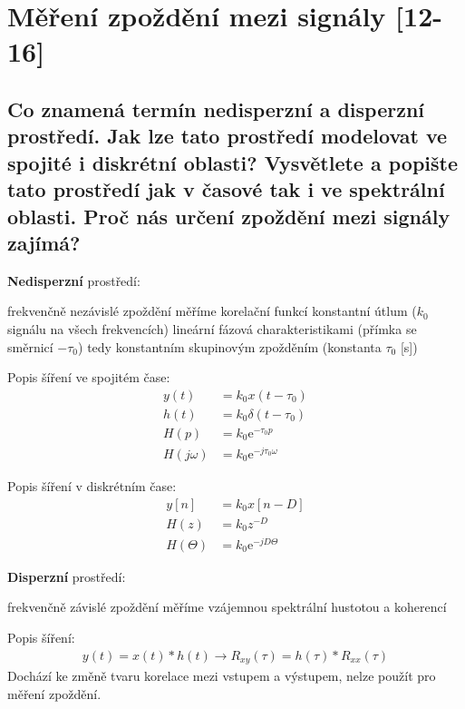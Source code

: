 \documentclass[a4paper,12pt]{article}   %
\newcommand{\mt}[1]{$#1$}
\newcommand{\e}{\text{e}}
\begin{document}
\clearpage


\section{Měření zpoždění mezi signály [12-16]} 
\subsection{Co znamená termín nedisperzní a disperzní prostředí. Jak lze tato prostředí modelovat ve spojité i diskrétní oblasti? Vysvětlete a popište tato prostředí jak v časové tak i ve spektrální oblasti. Proč nás určení zpoždění mezi signály zajímá?}\label{sec:zpozdeni:uvod}


\textbf{Nedisperzní} prostředí:
\begin{outline}
        \1 frekvenčně nezávislé
        \1 zpoždění měříme korelační funkcí
        \1 konstantní útlum (\mt{k_0} signálu na všech frekvencích)
        \1 lineární fázová charakteristikami (přímka se směrnicí \mt{-\tau_0})
        \2 tedy konstantním skupinovým zpožděním (konstanta \mt{\tau_0} [s])
\end{outline}

Popis šíření ve spojitém čase:\\
\begin{align*}
        y(t) &= k_0 x (t-\tau_0)\\
        h(t) &= k_0\delta(t-\tau_0)\\
        H(p) &= k_0\e^{-\tau_0 p}\\
        H(j\omega) &= k_0\e^{-j\tau_0\omega}
\end{align*}

Popis šíření v diskrétním čase:
\begin{align*}
        y[n] &= k_0 x[n-D]\\
        H(z) &= k_0z^{-D}\\
        H(\Theta) &= k_0\e^{-jD\Theta}
\end{align*} 


\textbf{Disperzní} prostředí:
\begin{outline}
        \1 frekvenčně závislé
        \1 zpoždění měříme vzájemnou spektrální hustotou a koherencí
\end{outline}

Popis šíření:
\begin{align*}
        y(t) = x(t)\ast h(t)\rightarrow R_{xy}(\tau) = h(\tau)\ast R_{xx}(\tau)
\end{align*}
Dochází ke změně tvaru korelace mezi vstupem a výstupem, nelze použít pro měření zpoždění. 
\end{document}
